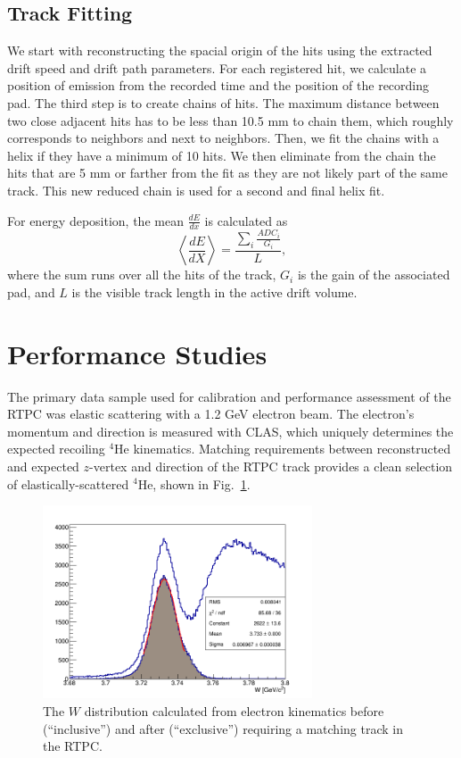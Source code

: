 \documentclass[preprint,5p]{elsarticle}
\begin{document}
\subsection{Track Fitting}\label{sec_rec}
We start with reconstructing the spacial origin of the hits using the extracted drift speed and drift path 
parameters. For each registered hit, we calculate a position of emission from 
the recorded time and the position of the recording pad. The third step 
is to create chains of hits. The maximum distance between two close adjacent 
hits has to be less than 10.5 mm to chain them, which roughly corresponds to 
neighbors and next to neighbors. Then, we fit the chains with a helix if they have a minimum of 
10 hits. We then eliminate from the chain the hits that are 5 mm or farther from the fit
as they are not likely part of the same track.
This new reduced chain is used for a second and final helix fit.

For energy deposition, the mean $\frac{dE}{dx}$ is calculated as
\begin{equation}
 \left\langle \frac{dE}{dX} \right\rangle= \frac{\sum\limits_{i} \frac{ADC_{i}}{G_i}}{L},
\end{equation}
where the sum runs over all the hits of the track, $G_{i}$ is the gain of 
the associated pad, and $L$ is the visible track length in the active drift 
volume. 

\section{Performance Studies}\label{sec_perfor}

The primary data sample used for calibration and performance assessment of the
RTPC was elastic scattering with a 1.2 GeV electron beam.  The electron's momentum
and direction is measured with CLAS, which uniquely determines the expected recoiling
$^4$He kinematics.  Matching requirements between reconstructed and expected $z$-vertex
and direction of the RTPC track provides a clean selection of elastically-scattered
$^4$He, shown in Fig.~\ref{fig:w}.


\begin{figure}[tb]\centering
  \includegraphics[width=8cm]{fig/fit_W_distribution_l.png}
  \caption{The $W$ distribution calculated from electron kinematics before (``inclusive'')
  and after (``exclusive'') requiring a matching track in the RTPC.\label{fig:w}}
\end{figure}
\end{document}
